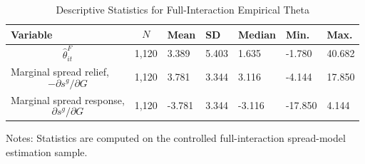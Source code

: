 \begin{table}[H]\centering
\begin{threeparttable}
\caption{Descriptive Statistics for Full-Interaction Empirical Theta}
\label{tab:theta_descriptive_stats}
\scriptsize
\begin{tabularx}{\textwidth}{lYYYYYY}
\toprule
Variable & $$N$$ & Mean & SD & Median & Min. & Max. \\
\midrule
$$\widehat{\theta}^{F}_{it}$$ & 1,120 & 3.389 & 5.403 & 1.635 & -1.780 & 40.682 \\
Marginal spread relief, $$-\partial s^g/\partial G$$ & 1,120 & 3.781 & 3.344 & 3.116 & -4.144 & 17.850 \\
Marginal spread response, $$\partial s^g/\partial G$$ & 1,120 & -3.781 & 3.344 & -3.116 & -17.850 & 4.144 \\
\bottomrule
\end{tabularx}
\begin{tablenotes}[flushleft]\footnotesize
\item Notes: Statistics are computed on the controlled full-interaction spread-model estimation sample.
\end{tablenotes}
\end{threeparttable}
\end{table}
